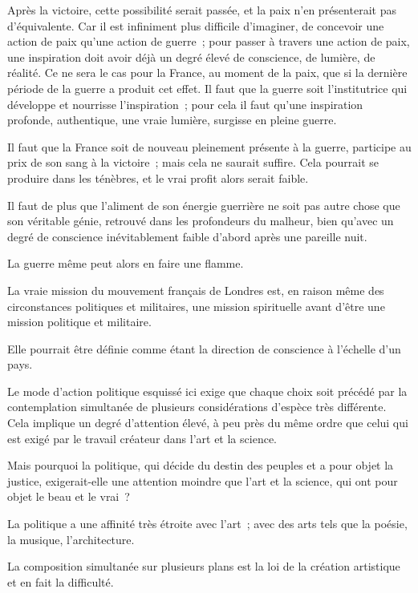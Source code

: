 \documentclass[french,twoside]{book} %
\begin{document}
Après la victoire, cette possibilité serait passée, et la paix n'en présenterait pas d'équivalente. Car il est infiniment plus difficile d'imaginer, de concevoir une action de paix qu'une action de guerre ; pour passer à travers une action de paix, une inspiration doit avoir déjà un degré élevé de conscience, de lumière, de réalité. Ce ne sera le cas pour la France, au moment de la paix, que si la dernière période de la guerre a produit cet effet. Il faut que la guerre soit l'institutrice qui développe et nourrisse l'inspiration ; pour cela il faut qu'une inspiration profonde, authentique, une vraie lumière, surgisse en pleine guerre.\par
Il faut que la France soit de nouveau pleinement présente à la guerre, participe au prix de son sang à la victoire ; mais cela ne saurait suffire. Cela pourrait se produire dans les ténèbres, et le vrai profit alors serait faible.\par
Il faut de plus que l'aliment de son énergie guerrière ne soit pas autre chose que son véritable génie, retrouvé dans les profondeurs du malheur, bien qu'avec un degré de conscience inévitablement faible d'abord après une pareille nuit.\par
La guerre même peut alors en faire une flamme.\par
La vraie mission du mouvement français de Londres est, en raison même des circonstances politiques et militaires, une mission spirituelle avant d'être une mission politique et militaire.\par
Elle pourrait être définie comme étant la direction de conscience à l'échelle d'un pays.\par
Le mode d'action politique esquissé ici exige que chaque choix soit précédé par la contemplation simultanée de plusieurs considérations d'espèce très différente. Cela implique un degré d'attention élevé, à peu près du même ordre que celui qui est exigé par le travail créateur dans l'art et la science.\par
Mais pourquoi la politique, qui décide du destin des peuples et a pour objet la justice, exigerait-elle une attention moindre que l'art et la science, qui ont pour objet le beau et le vrai ?\par
La politique a une affinité très étroite avec l'art ; avec des arts tels que la poésie, la musique, l'architecture.\par
La composition simultanée sur plusieurs plans est la loi de la création artistique et en fait la difficulté.\par
\end{document}
